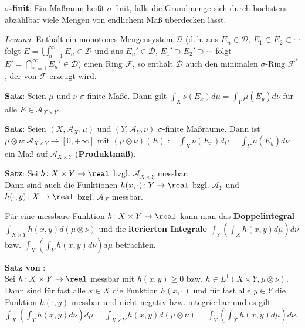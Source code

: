 \textbf{$\sigma$-finit}:
Ein Maßraum heißt $\sigma$-finit, falls die Grundmenge sich durch
höchstens abzählbar viele Mengen von endlichem Maß überdecken lässt.

\emph{Lemma}: Enthält ein monotones Mengensystem $\mathcal{D}$
(d.\,h. aus $E_n \in \mathcal{D}$, $E_1 \subset E_2 \subset \dotsb$ folgt
$E = \bigcup_{n=1}^\infty E_n \in \mathcal{D}$ und aus
$E_n' \in \mathcal{D}$, $E_1' \supset E_2' \supset \dotsb$ folgt
$E' = \bigcap_{n=1}^\infty E_n' \in \mathcal{D}$)
einen Ring $\mathcal{F}$, so enthält $\mathcal{D}$ auch den minimalen
$\sigma$-Ring $\mathcal{F}^\ast$, der von $\mathcal{F}$ erzeugt wird.

\linie

\textbf{Satz}:
Seien $\mu$ und $\nu$ $\sigma$-finite Maße.
Dann gilt $\int_X \nu(E_x) d\mu = \int_Y \mu(E_y) d\nu$
für alle $E \in \mathcal{A}_{X \times Y}$.

\textbf{Satz}:
Seien $(X, \mathcal{A}_X, \mu)$ und $(Y, \mathcal{A}_Y, \nu)$ $\sigma$-finite
Maßräume.
Dann ist
$\mu \otimes \nu\colon \mathcal{A}_{X \times Y} \rightarrow [0, +\infty]$
mit $(\mu \otimes \nu)(E) := \int_X \nu(E_x) d\mu = \int_Y \mu(E_y) d\nu$
ein Maß auf $\mathcal{A}_{X \times Y}$ (\textbf{Produktmaß}).

\linie

\textbf{Satz}:
Sei $h\colon X \times Y \rightarrow \real$ bzgl. $\mathcal{A}_{X \times Y}$
messbar. \\
Dann sind auch die Funktionen $h(x, \cdot)\colon Y \rightarrow \real$ bzgl.
$\mathcal{A}_Y$ und $h(\cdot, y)\colon X \rightarrow \real$ bzgl.
$\mathcal{A}_X$ messbar.

Für eine messbare Funktion $h\colon X \times Y \rightarrow \real$
kann man das \textbf{Doppelintegral}
$\int_{X \times Y} h(x, y) d(\mu \otimes \nu)$
und die \textbf{iterierten Integrale}
$\int_Y (\int_X h(x, y) d\mu) d\nu$ bzw. $\int_X (\int_Y h(x, y) d\nu) d\mu$
betrachten.

\textbf{Satz von }: \\
Sei $h\colon X \times Y \rightarrow \real$ messbar mit $h(x, y) \ge 0$
bzw. $h \in L^1(X \times Y, \mu \otimes \nu)$. \\
Dann sind für fast alle $x \in X$ die Funktion
$h(x, \cdot)$ und für fast alle $y \in Y$ die Funktion
$h(\cdot, y)$ messbar und
nicht-negativ bzw. integrierbar und es gilt \\
$\int_X (\int_Y h(x, y) d\nu) d\mu =
\int_{X \times Y} h(x, y) d(\mu \otimes \nu) =
\int_Y (\int_X h(x, y) d\mu) d\nu$.

